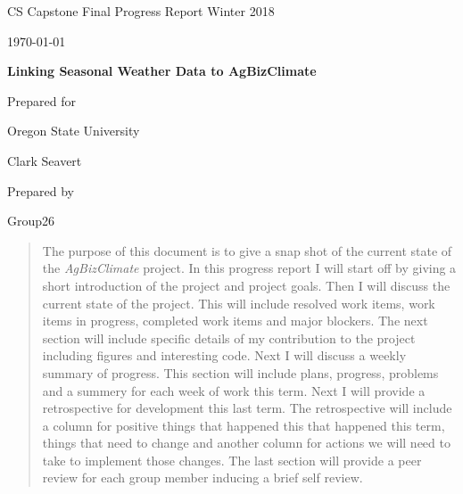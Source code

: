 \documentclass[onecolumn, draftclsnofoot,10pt, compsoc]{article}
\def \CapstoneTeamName{AgBizClimate}
\def \CapstoneTeamNumber{26}
\def \GroupMemberOne{}%
\def \CapstoneProjectName{ Linking Seasonal Weather Data to AgBizClimate\texttrademark}
\def \CapstoneSponsorCompany{ Oregon State University}
\def \CapstoneSponsorPerson{ Clark Seavert}
\def \DocType{		%
				Final Progress Report Winter 2018
				}
\newcommand{\NameSigPair}[1]{\par
\makebox[2.75in][r]{#1} \hfil 	\makebox[3.25in]{\makebox[2.25in]{\hrulefill} \hfill		\makebox[.75in]{\hrulefill}}
\par\vspace{-12pt} \textit{\tiny\noindent
\makebox[2.75in]{} \hfil		\makebox[3.25in]{\makebox[2.25in][r]{Signature} \hfill	\makebox[.75in][r]{Date}}}}
\renewcommand{\NameSigPair}[1]{#1}
\begin{document}
\begin{titlepage}
    \begin{singlespace}
        \hfill
        \par\vspace{.2in}
        \centering
        \scshape{
            \huge CS Capstone \DocType \par
            {\large\today}\par
            \vspace{.5in}
            \textbf{\Huge\CapstoneProjectName}\par
            \vfill
            {\large Prepared for}\par
            \Huge \CapstoneSponsorCompany\par
            \vspace{5pt}
            {\Large\NameSigPair{\CapstoneSponsorPerson}\par}
            {\large Prepared by }\par
            Group\CapstoneTeamNumber\par
            \vspace{5pt}
            {\Large
                \NameSigPair{\GroupMemberOne}\par
            }
            \vspace{20pt}
        }
        \begin{abstract}
					The purpose of this document is to give a snap shot of the current state of the \textit{AgBizClimate} project. In this progress report I will start off by giving a short introduction of the project and project goals. Then I will discuss the current state of the project. This will include resolved work items, work items in progress, completed work items and major blockers. The next section will include specific details of my contribution to the project including figures and interesting code. Next I will discuss a weekly summary of progress. This section will include plans, progress, problems and a summery for each week of work this term. Next I will provide a retrospective for development this last term. The retrospective will include a column for positive things that happened this that happened this term, things that need to change and another column for actions we will need to take to implement those changes. The last section will provide a peer review for each group member inducing a brief self review.\\
        \end{abstract}
    \end{singlespace}
\end{titlepage}
\newpage
{}
\tableofcontents
\newpage
\clearpage
\end{document}
